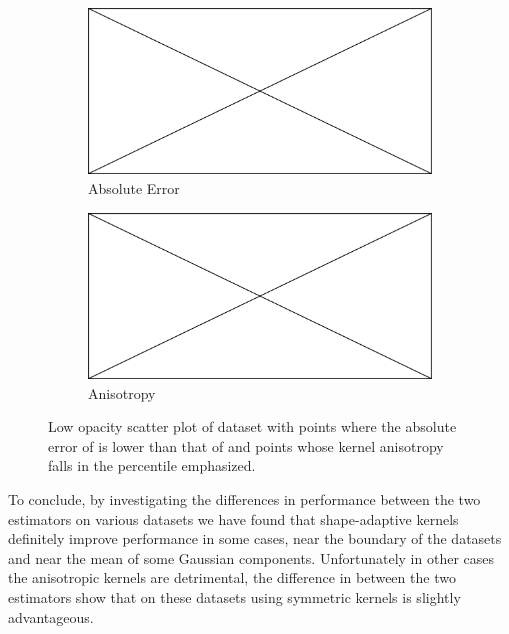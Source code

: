 		\begin{figure}
			\centering
			\begin{subfigure}{0.23\textwidth}
				\centering
				\includegraphics[keepaspectratio=true, width=\textwidth, height=0.23\textheight]{img/missingfigure.png}
				\caption{Absolute Error}
				\label{fig:discussion:ferdosi3Noise:mbeLowerError}
			\end{subfigure}		
			\begin{subfigure}{0.23\textwidth}
				\centering
				\includegraphics[keepaspectratio=true, width=\textwidth, height=0.23\textheight]{img/missingfigure.png}
				\caption{Anisotropy}
				\label{fig:discussion:ferdosi3Noise:anisotropy}
			\end{subfigure}			
			\caption{Low opacity scatter plot of dataset \ferdosiThreeNoise with %
				 points where the absolute error of \mbe is lower than that of \sambe and %
				 points whose kernel anisotropy falls in the  percentile emphasized.}
			\label{fig:discussion:ferdosi3Noise}
		\end{figure}		

To conclude, by investigating the differences in performance between the two estimators on various datasets we have found that shape-adaptive kernels definitely improve performance in some cases, \eg near the boundary of the datasets and near the mean of some Gaussian components. Unfortunately in other cases the anisotropic kernels are detrimental, the difference in \mse between the two estimators show that on these datasets using symmetric kernels is slightly advantageous. 